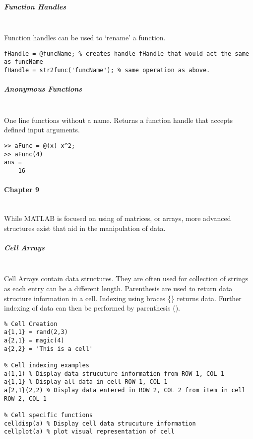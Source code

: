 \documentclass[12pt]{article}
\begin{document}
\subparagraph{Function Handles} \ \\
Function handles can be used to `rename' a function.

\begin{verbatim}
fHandle = @funcName; % creates handle fHandle that would act the same as funcName
fHandle = str2func('funcName'); % same operation as above.
\end{verbatim}

\subparagraph{Anonymous Functions} \ \\
One line functions without a name. 
Returns a function handle that accepts defined input arguments.
\begin{verbatim}
>> aFunc = @(x) x^2;
>> aFunc(4)
ans =
    16
\end{verbatim}

\pagebreak
\paragraph{Chapter 9} \ \\
While MATLAB is focused on using of matrices, or arrays, more advanced structures exist that aid in the manipulation of data.

\subparagraph{Cell Arrays} \ \\
Cell Arrays contain data structures. 
They are often used for collection of strings as each entry can be a different length.
Parenthesis are used to return data structure information in a cell.
Indexing using braces \{\} returns data.
Further indexing of data can then be performed by parenthesis ().

\begin{verbatim}
% Cell Creation
a{1,1} = rand(2,3)
a{2,1} = magic(4)
a{2,2} = 'This is a cell'

% Cell indexing examples
a(1,1) % Display data strucuture information from ROW 1, COL 1
a{1,1} % Display all data in cell ROW 1, COL 1
a{2,1}(2,2) % Display data entered in ROW 2, COL 2 from item in cell ROW 2, COL 1

% Cell specific functions
celldisp(a) % Display cell data strucuture information
cellplot(a) % plot visual representation of cell 
\end{verbatim}
\end{document}
